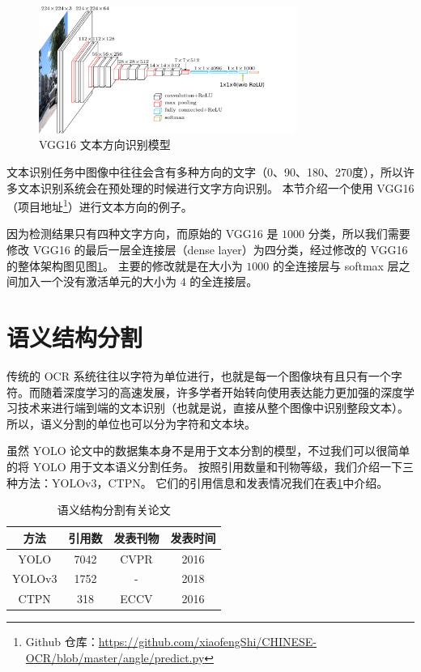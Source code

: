\begin{figure}[h!]
	\centering
	\includegraphics[width=0.75\textwidth]{figure/resources/vgg16_text_angle.png}
	\caption{VGG16 文本方向识别模型\label{vgg16_text_angle}}
\end{figure}

文本识别任务中图像中往往会含有多种方向的文字（0、90、180、270度），所以许多文本识别系统会在预处理的时候进行文字方向识别。
本节介绍一个使用 VGG16\cite{vgg} （项目地址\footnote{Github 仓库：\url{https://github.com/xiaofengShi/CHINESE-OCR/blob/master/angle/predict.py}}）进行文本方向的例子。

因为检测结果只有四种文字方向，而原始的 VGG16 是 $1000$ 分类，所以我们需要修改 VGG16 的最后一层全连接层（dense layer）为四分类，经过修改的 VGG16 的整体架构图见图\ref{vgg16_text_angle}。
主要的修改就是在大小为 $1000$ 的全连接层与 softmax 层之间加入一个没有激活单元的大小为 $4$ 的全连接层。

\section{语义结构分割}
传统的 OCR 系统往往以字符为单位进行，也就是每一个图像块有且只有一个字符。而随着深度学习的高速发展，许多学者开始转向使用表达能力更加强的深度学习技术来进行端到端的文本识别（也就是说，直接从整个图像中识别整段文本）。
所以，语义分割的单位也可以分为字符和文本块。

虽然 YOLO 论文中的数据集本身不是用于文本分割的模型，不过我们可以很简单的将 YOLO 用于文本语义分割任务。
按照引用数量和刊物等级，我们介绍一下三种方法：YOLOv3\cite{yolov3}，CTPN\cite{CTPN}。
它们的引用信息和发表情况我们在表\ref{tab:preprocessing_papers}中介绍。

\begin{table}[!hpt]
	\caption[]{语义结构分割有关论文}
	\label{tab:preprocessing_papers}
	\centering
	\begin{tabular}{|c|c|c|c|}
		\hline
		方法 & 引用数\footnotemark & 发表刊物 & 发表时间 \\ [0.5ex] 
		\hline
		YOLO & 7042 & CVPR & 2016 \\
		\hline 
		YOLOv3 & 1752 & - & 2018 \\ 
		\hline
		CTPN & 318 & ECCV & 2016 \\
		\hline
	\end{tabular}
\end{table}

